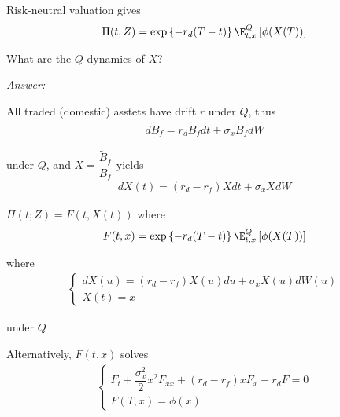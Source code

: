 \noindent Risk-neutral valuation gives
\begin{equation*}
  \begin{gathered}
    \Pi(t;Z) = \text{exp}\left\{-r_d(T-t)\right\}\E_{t,x}^Q\left[\phi(X(T))\right]
  \end{gathered}
\end{equation*}\par
\noindent What are the $Q$-dynamics of $X$?
\par\bigskip
\noindent\textit{Answer:}\par
\noindent All traded (domestic) asstets have drift $r$ under $Q$, thus
\begin{equation*}
  \begin{gathered}
    d\widetilde{B}_f = r_d\widetilde{B}_fdt+\sigma_x\widetilde{B}_fdW
  \end{gathered}
\end{equation*}\par
\noindent under $Q$, and $X = \dfrac{\widetilde{B}_f}{B_f}$ yields
\begin{equation*}
  \begin{gathered}
    dX(t) = (r_d-r_f)Xdt+\sigma_xXdW
  \end{gathered}
\end{equation*}
\par\bigskip
\begin{lem}[]{}
  $\Pi(t;Z) = F(t,X(t))$ where
  \begin{equation*}
    \begin{gathered}
      F(t,x) = \text{exp}\left\{-r_d(T-t)\right\}\E_{t,x}^Q\left[\phi(X(T))\right]
    \end{gathered}
  \end{equation*}\par
  \noindent where
  \begin{equation*}
    \begin{gathered}
      \begin{cases}
        dX(u) = (r_d-r_f)X(u)du+\sigma_xX(u)dW(u)\\
        X(t) = x
      \end{cases}
    \end{gathered}
  \end{equation*}\par
  \noindent under $Q$
  \par\bigskip
  \noindent Alternatively, $F(t,x)$ solves
  \begin{equation*}
    \begin{gathered}
      \begin{cases}
        F_t+\dfrac{\sigma_x^2}{2}x^2F_{xx}+(r_d-r_f)xF_x-r_dF=0\\
        F(T,x) = \phi(x)
      \end{cases}
    \end{gathered}
  \end{equation*}
\end{lem}
